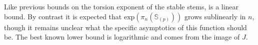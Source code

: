 \begin{rmk}
  Like previous bounds on the torsion exponent of the stable stems,
   is a linear bound.
  By contrast it is expected that $\mathrm{exp}(\pi_n(\mathbb{S}_{(p)}))$ grows sublinearly in $n$,
  though it remains unclear what the specific asymptotics of this function should be.
  The best known lower bound is logarithmic and comes from the image of $J$.
\end{rmk}


